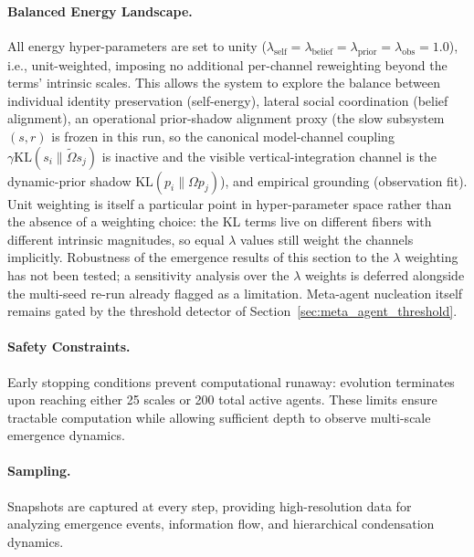 \documentclass[11pt]{article}
\begin{document}
\paragraph{Balanced Energy Landscape.}
All energy hyper-parameters are set to unity ($\lambda_{\text{self}} = \lambda_{\text{belief}} = \lambda_{\text{prior}} = \lambda_{\text{obs}} = 1.0$), i.e., unit-weighted, imposing no additional per-channel reweighting beyond the terms' intrinsic scales. This allows the system to explore the balance between individual identity preservation (self-energy), lateral social coordination (belief alignment), an operational prior-shadow alignment proxy (the slow subsystem $(s,r)$ is frozen in this run, so the canonical model-channel coupling $\gamma\mathrm{KL}(s_i\|\tilde\Omega s_j)$ is inactive and the visible vertical-integration channel is the dynamic-prior shadow $\mathrm{KL}(p_i\|\Omega p_j)$), and empirical grounding (observation fit). Unit weighting is itself a particular point in hyper-parameter space rather than the absence of a weighting choice: the KL terms live on different fibers with different intrinsic magnitudes, so equal $\lambda$ values still weight the channels implicitly. Robustness of the emergence results of this section to the $\lambda$ weighting has not been tested; a sensitivity analysis over the $\lambda$ weights is deferred alongside the multi-seed re-run already flagged as a limitation. Meta-agent nucleation itself remains gated by the threshold detector of Section~\ref{sec:meta_agent_threshold}.

\paragraph{Safety Constraints.}
Early stopping conditions prevent computational runaway: evolution terminates upon reaching either 25 scales or 200 total active agents. These limits ensure tractable computation while allowing sufficient depth to observe multi-scale emergence dynamics.

\paragraph{Sampling.}
Snapshots are captured at every step, providing high-resolution data for analyzing emergence events, information flow, and hierarchical condensation dynamics.
\end{document}
